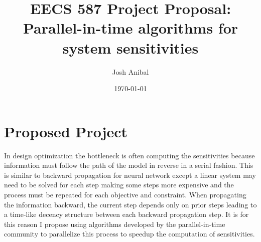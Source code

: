 \documentclass{article}
\title{EECS 587 Project Proposal: Parallel-in-time algorithms for system sensitivities}
\author{Josh Anibal}
\date{\today}
\begin{document}
\label{Eqn:DE}
\maketitle




\section*{Proposed Project}
In design optimization the bottleneck is often computing the sensitivities because information must follow the path of the model in reverse in a serial fashion.
This is similar to backward propagation for neural network except a linear system may need to be solved for each step making some steps more expensive and the process must be repeated for each objective and constraint.
When propagating the information backward, the current step depends only on prior steps leading to a time-like decency structure between each backward propagation step.
It is for this reason I propose using algorithms developed by the parallel-in-time community to parallelize this process to speedup the computation of sensitivities.
\end{document}
